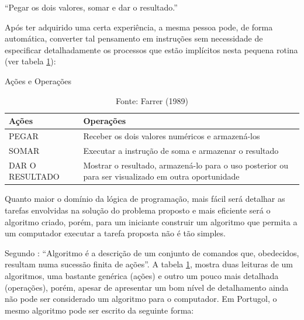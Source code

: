 ``Pegar os dois valores, somar e dar o resultado.''

Após ter adquirido uma certa experiência, a mesma pessoa pode, de forma
automática, converter tal pensamento em instruções sem necessidade de especificar
detalhadamente os processos que estão implícitos nesta pequena rotina (ver tabela \ref{tab:action+operation}):

\begin{table} [!htb]
  \caption{Ações e Operações}\label{tab:action+operation}
  \centering
  \begin{tabular}{ m{2.4cm} | m{10.9cm} }\hline
  \bfseries Ações & \bfseries Operações \\ \hline
  \MakeTextUppercase{Pegar} & Receber os dois valores numéricos e armazená-los \\ \hline
  \MakeTextUppercase{Somar} & Executar a instrução de soma e armazenar o resultado \\ \hline
  \MakeUppercase{Dar o \mbox{Resultado}} & Mostrar o resultado, armazená-lo para o uso
  posterior ou para ser visualizado em outra oportunidade \\
  \hline
  \end{tabular}
  \caption*{\footnotesize Fonte: Farrer (1989)}
\end{table}

Quanto maior o domínio da lógica de programação, mais fácil será detalhar as
tarefas envolvidas na solução do problema proposto e mais eficiente será o
algoritmo criado, porém, para um iniciante construir um algoritmo que permita
a um computador executar a tarefa proposta não é tão simples.

Segundo \cite[p. 17]{farreretal1989}: ``Algoritmo é a descrição de um conjunto de comandos que, obedecidos, resultam numa sucessão finita de ações''.
A tabela \ref{tab:action+operation}, mostra duas leituras de um algoritmos, uma bastante genérica (ações) e outro um pouco mais detalhada (operações), porém, apesar de apresentar um bom nível de detalhamento ainda não pode ser considerado um algoritmo para o computador. Em Portugol, o mesmo algoritmo pode ser escrito da seguinte forma:

